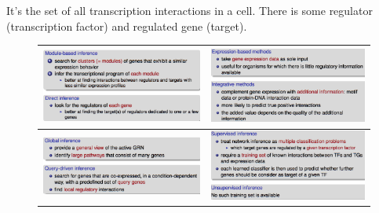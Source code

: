 It's the set of all transcription interactions in a cell. There is some regulator (transcription factor) and regulated gene (target). 

\begin{landscape}

\begin{figure}
\begin{tabular}{|c|c|}
  \hline
	\includegraphics[scale=0.5]{images/70.png}
  & 
	\includegraphics[scale=0.5]{images/71.png}
 \\ \hline
	\includegraphics[scale=0.5]{images/72.png}
  & 
	\includegraphics[scale=0.5]{images/73.png}
  \\
  \hline
\end{tabular}

\end{figure}

\end{landscape}